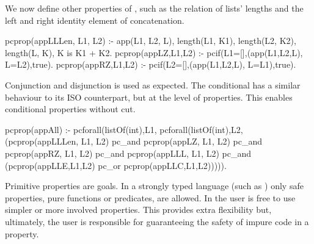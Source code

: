 We now define other properties of , such as the relation
of lists' lengths and the left and right identity element of
concatenation.
%
\begin{yapcode}
 pcprop({appLLLen, L1, L2}) :- app(L1, L2, L),
   length(L1, K1), length(L2, K2), length(L, K), K is K1 + K2.
 pcprop({appLZ,L1,L2}) :- pcif(L1=[],(app(L1,L2,L), L=L2),true).
 pcprop({appRZ,L1,L2}) :- pcif(L2=[],(app(L1,L2,L), L=L1),true).
\end{yapcode}
%
Conjunction and disjunction is used as expected.
%
The conditional  has a similar behaviour to its ISO
\Prolog{} counterpart, but at the level of \plqc{} properties.
%
This enables conditional properties without cut. %
%
\begin{yapcode}
 pcprop(appAll) :- pcforall(listOf(int),L1, pcforall(listOf(int),L2,
   (pcprop({appLLLen, L1, L2}) pc_and pcprop({appLZ, L1, L2})
   pc_and pcprop({appRZ, L1, L2}) pc_and pcprop({appLLL, L1, L2})
   pc_and (pcprop({appLLE,L1,L2}) pc_or pcprop({appLLC,L1,L2}))))).
\end{yapcode}



Primitive properties are \Prolog{} goals.
%
In a strongly typed language (such as \Haskell{}) only
safe properties, pure functions or predicates, are allowed.
%
In \plqc{} the user is free to use simpler or more involved properties.
%
This provides extra flexibility but, ultimately, the user is
responsible for guaranteeing the safety of impure code in a property.




